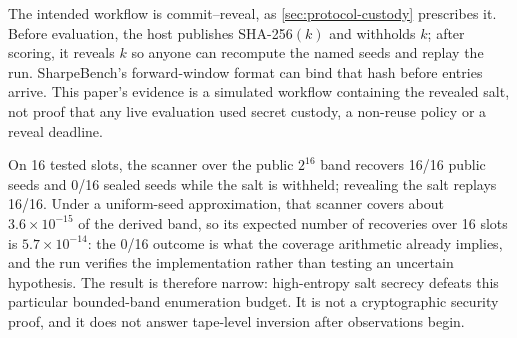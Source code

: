 The intended workflow is commit--reveal, as \cref{sec:protocol-custody} prescribes it. Before evaluation, the host publishes SHA-256$(k)$ and withholds $k$; after scoring, it reveals $k$ so anyone can recompute the named seeds and replay the run. SharpeBench's forward-window format can bind that hash before entries arrive. This paper's evidence is a simulated workflow containing the revealed salt, not proof that any live evaluation used secret custody, a non-reuse policy or a reveal deadline.

On 16 tested slots, the scanner over the public $2^{16}$ band recovers 16/16 public seeds and 0/16 sealed seeds while the salt is withheld; revealing the salt replays 16/16. Under a uniform-seed approximation, that scanner covers about $3.6\times10^{-15}$ of the derived band, so its expected number of recoveries over 16 slots is $5.7\times10^{-14}$: the 0/16 outcome is what the coverage arithmetic already implies, and the run verifies the implementation rather than testing an uncertain hypothesis. The result is therefore narrow: high-entropy salt secrecy defeats this particular bounded-band enumeration budget. It is not a cryptographic security proof, and it does not answer tape-level inversion after observations begin.
